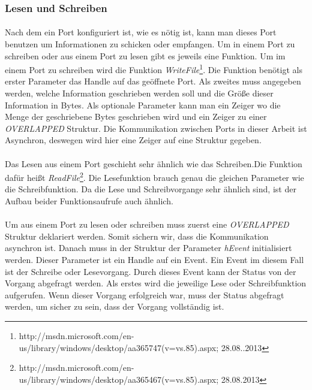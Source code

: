 \subsubsection{Lesen und Schreiben}
\paragraph{}
Nach dem ein Port konfiguriert ist, wie es nötig ist, kann man dieses Port benutzen um Informationen zu schicken oder empfangen. Um in einem Port zu schreiben oder aus einem Port zu lesen gibt es jeweils eine Funktion. Um im einem Port zu schreiben wird die Funktion \textit{WriteFile}\footnote{http://msdn.microsoft.com/en-us/library/windows/desktop/aa365747(v=vs.85).aspx; 28.08..2013}. Die Funktion benötigt als erster Parameter das Handle auf das geöffnete Port. Als zweites muss angegeben werden, welche Information geschrieben werden soll und die Größe dieser Information in Bytes. Als optionale Parameter kann man ein Zeiger wo die Menge der geschriebene Bytes geschrieben wird und ein Zeiger zu einer \textit{OVERLAPPED} Struktur. Die Kommunikation zwischen Ports in dieser Arbeit ist Asynchron, deswegen wird hier eine Zeiger auf eine Struktur gegeben.

\paragraph{}
Das Lesen aus einem Port geschieht sehr ähnlich wie das Schreiben.Die Funktion dafür heißt \textit{ReadFile}\footnote{http://msdn.microsoft.com/en-us/library/windows/desktop/aa365467(v=vs.85).aspx; 28.08.2013}. Die Lesefunktion brauch genau die gleichen Parameter wie die Schreibfunktion. Da die Lese und Schreibvorgange sehr ähnlich sind, ist der Aufbau beider Funktionsaufrufe auch ähnlich.

\paragraph{}
Um aus einem Port zu lesen oder schreiben muss zuerst eine \textit{OVERLAPPED} Struktur deklariert werden. Somit sichern wir, dass die Kommunikation asynchron ist. Danach muss in der Struktur der Parameter \textit{hEvent} initialisiert werden. Dieser Parameter ist ein Handle auf ein Event. Ein Event im diesem Fall ist der Schreibe oder Lesevorgang. Durch dieses Event kann der Status von der Vorgang abgefragt werden. Als erstes wird die jeweilige Lese oder Schreibfunktion aufgerufen. Wenn dieser Vorgang erfolgreich war, muss der Status abgefragt werden, um sicher zu sein, dass der Vorgang vollständig ist.
 
